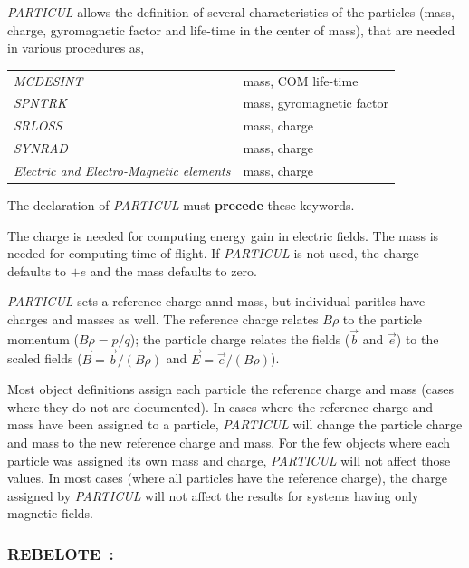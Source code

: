 \textsl{PARTICUL} allows the definition of several characteristics of the particles 
(mass, charge, gyromagnetic factor and life-time in the 
center of mass), that are needed in various  procedures as, 
\bigskip           

\begin{tabular}{>{\sl}l!{~:}l}
  MCDESINT  & mass,  COM  life-time\\
  SPNTRK    & mass,  gyromagnetic factor \\
  SRLOSS    & mass, charge \\
  SYNRAD    & mass, charge \\
  Electric and Electro-Magnetic elements
            & mass, charge 
\end{tabular}
\bigskip           

\noindent The declaration of \textsl{PARTICUL} must \textbf{precede} these keywords. 

\noindent
The charge is needed for computing energy gain in electric fields.
The mass is needed for computing time of flight.  If \textsl{PARTICUL} is not
used, the charge defaults to $+e$ and the mass defaults to zero.

\noindent
\textsl{PARTICUL} sets a reference charge annd mass, but individual paritles
have charges and masses as well.  The reference charge relates $B\rho$
to the particle momentum ($B\rho=p/q$); the particle charge relates
the fields ($\vec b$ and $\vec e$) to the scaled fields
($\vec B=\vec b/(B\rho)$ and $\vec E=\vec e/(B\rho)$).

\noindent
Most object definitions assign each particle the reference charge and
mass (cases where they do not are documented).  In cases where the
reference charge and mass have been assigned to a particle, \textsl{PARTICUL}
will change the particle charge and mass to the new reference charge
and mass.  For the few objects where each particle was assigned its
own mass and charge, \textsl{PARTICUL} will not affect those values.  In most
cases (where all particles have the reference charge), the charge
assigned by \textsl{PARTICUL} will not affect the results for systems having
only magnetic fields.

 \newpage

\subsubsection*{REBELOTE~: \REBELOTETitl} \label{REBELOTE} 

